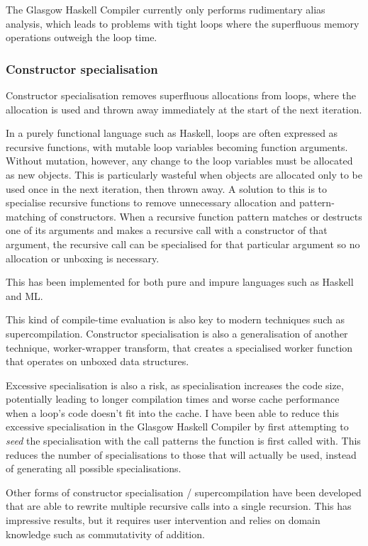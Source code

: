 The Glasgow Haskell Compiler currently only performs rudimentary alias analysis, which leads to problems with tight loops
where the superfluous memory operations outweigh the loop time.

\subsubsection{Constructor specialisation}

Constructor specialisation removes superfluous allocations from loops\cite{bechet1994limix},
where the allocation is used and thrown away immediately at the start of the next iteration.

In a purely functional language such as Haskell, loops are often expressed as recursive functions, with mutable loop variables becoming function arguments. 
Without mutation, however, any change to the loop variables must be allocated as new objects\cite{peyton2007call}.
This is particularly wasteful when objects are allocated only to be used once in the next iteration, then thrown away.
A solution to this is to specialise recursive functions to remove unnecessary allocation and pattern-matching of constructors.
When a recursive function pattern matches or destructs one of its arguments and makes a recursive call with a constructor of that argument,
the recursive call can be specialised for that particular argument so no allocation or unboxing is necessary.

This has been implemented for both pure and impure languages such as Haskell and ML\cite{thiemann1993avoiding, mogensen1993constructor}.

This kind of compile-time evaluation is also key to modern techniques such as supercompilation\cite{bolingbroke2011supercomp}.
Constructor specialisation is also a generalisation of another technique, worker-wrapper transform\cite{gill2009worker},
that creates a specialised worker function that operates on unboxed data structures.

Excessive specialisation is also a risk, as specialisation increases the code size, potentially leading to longer compilation times and worse cache performance when a loop's code doesn't fit into the cache.
I have been able to reduce this excessive specialisation in the Glasgow Haskell Compiler by first attempting to \emph{seed} the specialisation with the call patterns the function is first called with.
This reduces the number of specialisations to those that will actually be used, instead of generating all possible specialisations.

Other forms of constructor specialisation / supercompilation have been developed that are able to rewrite multiple recursive calls into a single recursion\cite{burstall1977transformation}.
This has impressive results, but it requires user intervention and relies on domain knowledge such as commutativity of addition.



